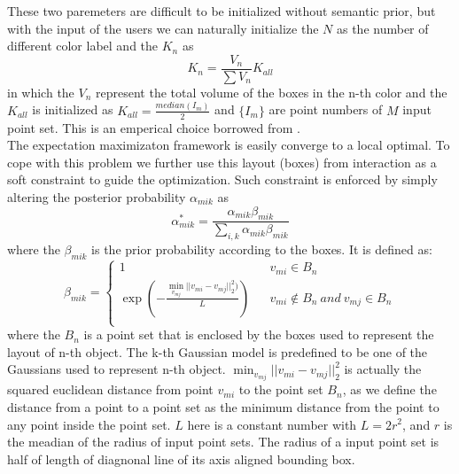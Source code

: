 These two paremeters are difficult to be initialized without semantic prior, but with the input of the users we can naturally initialize the $N$ as the number of different color label and the ${K_n}$ as 
\begin{equation}
\label{equ:K_n}
K_n=\frac{V_n}{\sum V_n}K_{all}
\end{equation}
in which the $V_n$ represent the total volume of the boxes in the n-th color and the $K_{all}$ is initialized as $K_{all}=\frac{median(I_m)}{2}$ and $\{I_m\}$ are point numbers of $M$ input point set. This is an emperical choice borrowed from \cite{Evangelidis2014}.\\
The expectation maximizaton framework is easily converge to a local optimal. To cope with this problem we further use this layout (boxes) from interaction as a soft constraint to guide the optimization. Such constraint is enforced by simply altering the posterior probability $\alpha_{mik}$ as\\
\begin{equation}
\label{equ:alteralpha}
\alpha_{mik}^*=\frac{\alpha_{mik}\beta_{mik}}{\sum_{i,k}\alpha_{mik}\beta_{mik}}
\end{equation}
where the $\beta_{mik}$ is the prior probability according to the boxes. It is defined as:\\
\begin{equation}
\beta_{mik}=\left\{
\begin{array}{rcl}
1& &v_{mi} \in B_n\\
\exp(-\frac{\min_{v_{mj}}|| v_{mi} - v_{mj} ||_2^2  )}{L})& &v_{mi} \notin B_n~and~v_{mj} \in B_n\\
\end{array} \right.
\end{equation}
where the $B_n$ is a point set that is enclosed by the boxes used to represent the layout of n-th object. The k-th Gaussian model is predefined to be one of the Gaussians used to represent n-th object. $\min_{v_{mj}}|| v_{mi} - v_{mj} ||_2^2$ is actually the squared euclidean distance from point $v_{mi}$ to the point set $B_n$, as we define the distance from a point to a point set as the minimum distance from the point to any point inside the point set. $L$ here is a constant number with $L=2r^2$, and $r$ is the meadian of the radius of input point sets. The radius of a input point set is half of length of diagnonal line of its axis aligned bounding box.   
